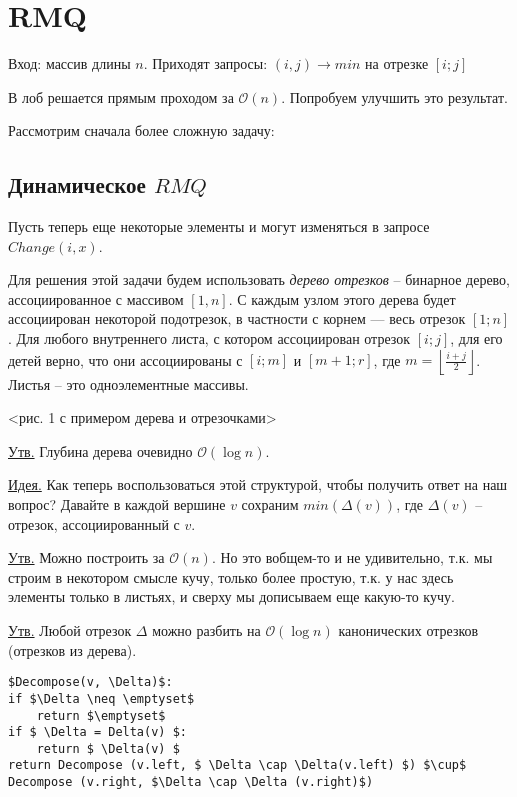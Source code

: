 \documentclass[fleqn, 12pt]{article}
\newcommand{\bigo}{\mathcal{O}}
\begin{document}
	
\section{RMQ}

Вход: массив длины $ n $. Приходят запросы: $ (i, j) \to min $ на отрезке $ [i;j] $

В лоб решается прямым проходом за $ \bigo(n) $. Попробуем улучшить это результат. 

Рассмотрим сначала более сложную задачу:



\subsection{Динамическое $ RMQ $}

Пусть теперь еще некоторые элементы и могут изменяться в запросе $ Change(i, x) $.

Для решения этой задачи будем использовать \textit{дерево отрезков} -- бинарное дерево, ассоциированное с массивом $ [1, n] $. С каждым узлом этого дерева будет ассоциирован некоторой подотрезок, в частности с корнем --- весь отрезок $ [1; n] $. Для любого внутреннего листа, с котором ассоциирован отрезок $ [i; j] $,  для его детей верно, что они ассоциированы с $ [i; m] $ и $ [m + 1; r] $, где $ m = \left \lfloor \frac{i + j}{2} \right \rfloor $. Листья -- это одноэлементные массивы.

<рис. 1 с примером дерева и отрезочками>

\underline{Утв.} Глубина дерева очевидно $ \bigo(\log n) $. 

\underline{Идея.} Как теперь воспользоваться этой структурой, чтобы получить ответ на наш вопрос? Давайте в каждой вершине $ v $ сохраним $ min(\Delta(v)) $, где $ \Delta(v) $ -- отрезок, ассоциированный с $ v $. 

\underline{Утв.} Можно построить за $ \bigo(n) $. Но это вобщем-то и не удивительно, т.к. мы строим в некотором смысле кучу, только более простую, т.к. у нас здесь элементы только в листьях, и сверху мы дописываем еще какую-то кучу.

\underline{Утв.} Любой отрезок $ \Delta $ можно разбить на $ \bigo(\log n) $ канонических отрезков (отрезков из дерева). 

\begin{lstlisting}
$Decompose(v, \Delta)$:
if $\Delta \neq \emptyset$
	return $\emptyset$
if $ \Delta = Delta(v) $:
	return $ \Delta(v) $
return Decompose (v.left, $ \Delta \cap \Delta(v.left) $) $\cup$ Decompose (v.right, $\Delta \cap \Delta (v.right)$)
\end{lstlisting}
\end{document}
